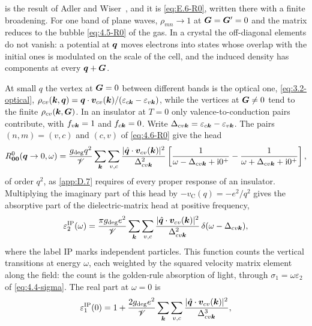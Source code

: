  is the result of Adler and Wiser~\cite{adler1962quantum,wiser1963dielectric}, and it is \cref{eq:E.6-R0}, written there with a finite broadening. For one band of plane waves, $\rho_{mn} \to 1$ at $\bm{G} = \bm{G}' = 0$ and the matrix reduces to the bubble \cref{eq:4.5-R0} of the gas. In a crystal the off-diagonal elements do not vanish: a potential at $\bm{q}$ moves electrons into states whose overlap with the initial ones is modulated on the scale of the cell, and the induced density has components at every $\bm{q} + \bm{G}$.

At small $q$ the vertex at $\bm{G} = 0$ between different bands is the optical one, \cref{eq:3.2-optical}, $\rho_{cv}(\bm{k},\bm{q}) = \bm{q}\cdot\bm{v}_{cv}(\bm{k})/(\varepsilon_{c\bm{k}} - \varepsilon_{v\bm{k}})$, while the vertices at $\bm{G} \neq 0$ tend to the finite $\rho_{cv}(\bm{k},\bm{G})$. In an insulator at $T = 0$ only valence-to-conduction pairs contribute, with $f_{v\bm{k}} = 1$ and $f_{c\bm{k}} = 0$. Write $\Delta_{cv\bm{k}} = \varepsilon_{c\bm{k}} - \varepsilon_{v\bm{k}}$. The pairs $(n,m) = (v,c)$ and $(c,v)$ of \cref{eq:4.6-R0} give the head
\begin{equation}
  R^0_{\bm{0}\bm{0}}(\bm{q}\to0,\omega) = \frac{g_{\mathrm{deg}}q^2}{\mathscr{V}}\sum_{\bm{k}}\sum_{v,c}\frac{|\hat{\bm{q}}\cdot\bm{v}_{cv}(\bm{k})|^2}{\Delta_{cv\bm{k}}^2}
  \left[\frac{1}{\omega - \Delta_{cv\bm{k}} + \mathrm{i}0^+} - \frac{1}{\omega + \Delta_{cv\bm{k}} + \mathrm{i}0^+}\right] ,
  \label{eq:4.6-head}
\end{equation}
of order $q^2$, as \cref{app:D.7} requires of every proper response of an insulator. Multiplying the imaginary part of this head by $-v_{\mathrm{C}}(q) = -e^2/q^2$ gives the absorptive part of the dielectric-matrix head at positive frequency,
\begin{equation}
  \varepsilon_2^{\mathrm{IP}}(\omega) = \frac{\pi g_{\mathrm{deg}}e^2}{\mathscr{V}}\sum_{\bm{k}}\sum_{v,c}\frac{|\hat{\bm{q}}\cdot\bm{v}_{cv}(\bm{k})|^2}{\Delta_{cv\bm{k}}^2}\,\delta(\omega - \Delta_{cv\bm{k}}) ,
  \label{eq:4.6-eps2}
\end{equation}
where the label IP marks independent particles. This function counts the vertical transitions at energy $\omega$, each weighted by the squared velocity matrix element along the field: the count is the golden-rule absorption of light, through $\sigma_1 = \omega\varepsilon_2$ of \cref{eq:4.4-sigma}. The real part at $\omega = 0$ is
\begin{equation}
  \varepsilon_1^{\mathrm{IP}}(0) = 1 + \frac{2g_{\mathrm{deg}}e^2}{\mathscr{V}}\sum_{\bm{k}}\sum_{v,c}\frac{|\hat{\bm{q}}\cdot\bm{v}_{cv}(\bm{k})|^2}{\Delta_{cv\bm{k}}^3} ,
  \label{eq:4.6-static}
\end{equation}
